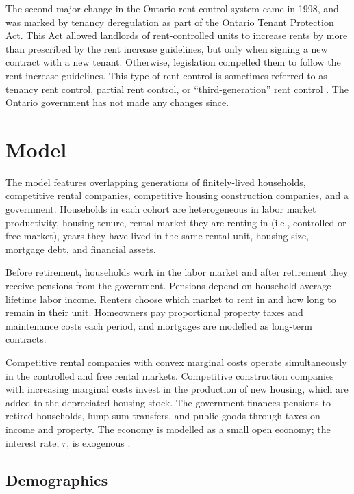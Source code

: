 \documentclass[parskip=full]{article}
\begin{document}
The second major change in the Ontario rent control system came in 1998, and was marked by tenancy deregulation as part of the Ontario Tenant Protection Act. This Act allowed landlords of rent-controlled units to increase rents by more than prescribed by the rent increase guidelines, but only when signing a new contract with a new tenant. Otherwise, legislation compelled them to follow the rent increase guidelines. This type of rent control is sometimes referred to as tenancy rent control, partial rent control, or “third-generation” rent control \citep{arnott-2003}. The Ontario government has not made any changes since. 

\section{Model}\label{sec:model}

The model features overlapping generations of finitely-lived households, competitive rental companies, competitive housing construction companies, and a government. Households in each cohort are heterogeneous in labor market productivity, housing tenure, rental market they are renting in (i.e., controlled or free market), years they have lived in the same rental unit, housing size, mortgage debt, and financial assets. 

Before retirement, households work in the labor market and after retirement they receive pensions from the government. Pensions depend on household average lifetime labor income. Renters choose which market to rent in and how long to remain in their unit. Homeowners pay proportional property taxes and maintenance costs each period, and mortgages are modelled as long-term contracts. 

Competitive rental companies with convex marginal costs operate simultaneously in the controlled and free rental markets. Competitive construction companies with increasing marginal costs invest in the production of new housing, which are added to the depreciated housing stock. The government finances pensions to retired households, lump sum transfers, and public goods through taxes on income and property. The economy is modelled as a small open economy; the interest rate, $r$, is exogenous \citep{sommeretal-2013,arslanetal-2015,sommersullivan-2017,kaplanetal-2019}. 

\subsection{Demographics}\label{subsection:demographics}
\end{document}
